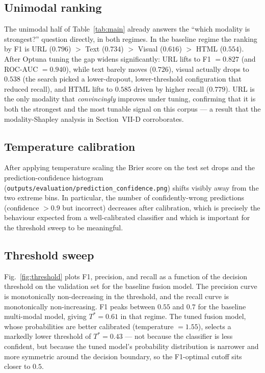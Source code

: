 \documentclass[conference]{IEEEtran}
\begin{document}
\subsection{Unimodal ranking}
The unimodal half of Table~\ref{tab:main} already answers the
``which modality is strongest?'' question directly, in both regimes.
In the baseline regime the ranking by F1 is
URL ($0.796$) $>$ Text ($0.734$) $>$ Visual ($0.616$) $>$ HTML
($0.554$).  After Optuna tuning the gap widens significantly: URL
lifts to F1 $=0.827$ (and ROC-AUC $=0.940$), while text barely moves
($0.726$), visual actually drops to $0.538$ (the search picked a
lower-dropout, lower-threshold configuration that reduced
recall), and HTML lifts to $0.585$ driven by higher recall
($0.779$).  URL is the only modality that \emph{convincingly}
improves under tuning, confirming that it is both the strongest and
the most tunable signal on this corpus --- a result that the
modality-Shapley analysis in Section~VII-D corroborates.

\subsection{Temperature calibration}
After applying temperature scaling the Brier score on the test set
drops and the prediction-confidence histogram
(\texttt{outputs/evaluation/prediction\_confidence.png}) shifts
visibly away from the two extreme bins. In particular, the number
of confidently-wrong predictions (confidence $>0.9$ but incorrect)
decreases after calibration, which is precisely the behaviour
expected from a well-calibrated classifier and which is important
for the threshold sweep to be meaningful.

\subsection{Threshold sweep}
Fig.~\ref{fig:threshold} plots F1, precision, and recall as a
function of the decision threshold on the validation set for the
baseline fusion model.  The precision curve is monotonically
non-decreasing in the threshold, and the recall curve is
monotonically non-increasing.  F1 peaks between $0.55$ and $0.7$ for
the baseline multi-modal model, giving $T^{*}=0.61$ in that regime.
The tuned fusion model, whose probabilities are better calibrated
(temperature $=1.55$), selects a markedly lower threshold of
$T^{*}=0.43$ --- not because the classifier is less confident, but
because the tuned model's probability distribution is narrower and
more symmetric around the decision boundary, so the F1-optimal
cutoff sits closer to $0.5$.
\end{document}
